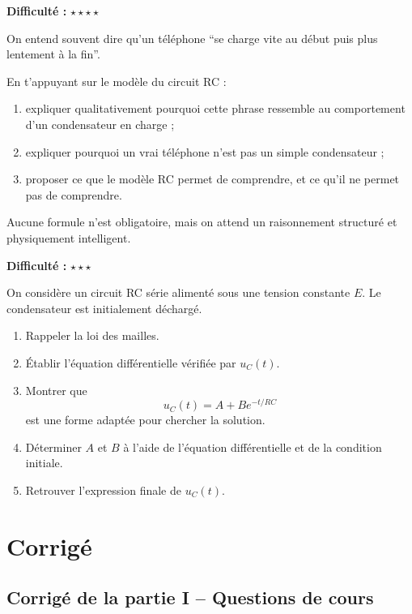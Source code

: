\documentclass[11pt,a4paper]{article}
\newcommand{\etoiles}[1]{\textbf{Difficulté :} #1}
\begin{document}
\begin{exercisebox}
\etoiles{\(\star\star\star\star\)}

On entend souvent dire qu'un téléphone ``se charge vite au début puis plus lentement à la fin''.

En t'appuyant sur le modèle du circuit RC :
\begin{enumerate}[label=\alph*)]
    \item expliquer qualitativement pourquoi cette phrase ressemble au comportement d'un condensateur en charge ;
    \item expliquer pourquoi un vrai téléphone n'est pas un simple condensateur ;
    \item proposer ce que le modèle RC permet de comprendre, et ce qu'il ne permet pas de comprendre.
\end{enumerate}

Aucune formule n'est obligatoire, mais on attend un raisonnement structuré et physiquement intelligent.
\end{exercisebox}

\begin{exercisebox}
\etoiles{\(\star\star\star\)}

On considère un circuit RC série alimenté sous une tension constante \(E\). Le condensateur est initialement déchargé.

\begin{enumerate}[label=\alph*)]
    \item Rappeler la loi des mailles.
    \item Établir l'équation différentielle vérifiée par \(u_C(t)\).
    \item Montrer que
    \[
    u_C(t)=A+Be^{-t/RC}
    \]
    est une forme adaptée pour chercher la solution.
    \item Déterminer \(A\) et \(B\) à l'aide de l'équation différentielle et de la condition initiale.
    \item Retrouver l'expression finale de \(u_C(t)\).
\end{enumerate}
\end{exercisebox}

\newpage

\section{Corrigé}

\subsection{Corrigé de la partie I -- Questions de cours}
\end{document}
